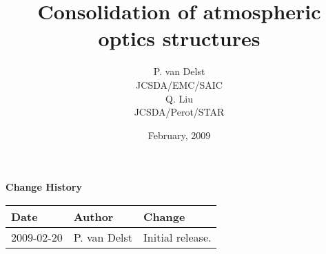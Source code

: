 




\title{Consolidation of atmospheric optics structures}
\author{P. van Delst\\JCSDA/EMC/SAIC\\[0.25in]
        Q. Liu\\JCSDA/Perot/STAR}
\date{February, 2009}



\maketitle

\draftwatermark

\thispagestyle{empty}
\vspace*{10cm}
\begin{center}
  {\sffamily\Large\bfseries Change History}
  \begin{table}[htp]
    \centering
    \begin{tabular}{|p{2cm}|p{3cm}|p{8cm}|}
      \hline
      \sffamily\textbf{Date} & \sffamily\textbf{Author} & \sffamily\textbf{Change}\\
      \hline\hline
      2009-02-20 & P. van Delst & Initial release.\\
      \hline
    \end{tabular}
  \end{table}
\end{center}
\clearpage
{}
\setcounter{page}{1}






%
%


%



